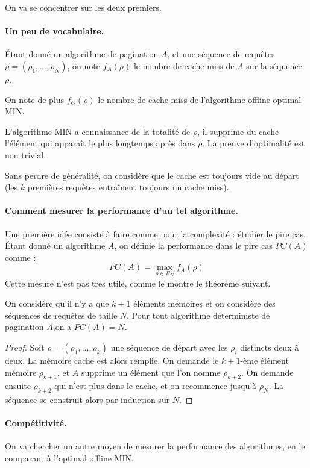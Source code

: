 On va se concentrer sur les deux premiers. 

\paragraph{Un peu de vocabulaire.} Étant donné un algorithme de pagination $A$, et une séquence de requêtes $\rho = (\rho_1,...,\rho_N)$, on note $f_A(\rho)$ le nombre de cache miss de $A$ sur la séquence $\rho$.

On note de plus $f_O(\rho)$ le nombre de cache miss de l'algorithme offline optimal MIN.

\begin{rem}
L'algorithme MIN a connaissance de la totalité de $\rho$, il supprime du cache l'élément qui apparaît le plus longtemps après dans $\rho$. La preuve d'optimalité est non trivial.
\end{rem}

\begin{rem}
Sans perdre de généralité, on considère que le cache est toujours vide au départ (les $k$ premières requêtes entraînent toujours un cache miss).
\end{rem}

\paragraph{Comment mesurer la performance d'un tel algorithme.} Une première idée consiste à faire comme pour la complexité : étudier le pire cas. Étant donné un algorithme $A$, on définie la performance dans le pire cas $PC(A)$ comme :
$$
PC(A) = \max_{\rho \in R_N} f_A(\rho)
$$
Cette mesure n'est pas très utile, comme le montre le théorème suivant.
\begin{theorem} On considère qu'il n'y a que $k+1$ éléments mémoires et on considère des séquences de requêtes de taille $N$. Pour tout algorithme déterministe de pagination $A$,on a $PC(A)=N$.
\end{theorem}
\begin{proof} Soit $\rho=(\rho_1,...,\rho_{k})$ une séquence de départ avec les $\rho_i$ distincts deux à deux. La mémoire cache est alors remplie. On demande le $k+1$-ème élément mémoire $\rho_{k+1}$, et $A$ supprime un élément que l'on nomme $\rho_{k+2}$. On demande ensuite $\rho_{k+2}$ qui n'est plus dans le cache, et on recommence jusqu'à $\rho_N$. La séquence se construit alors par induction sur $N$.
\end{proof}

\paragraph{Compétitivité.} On va chercher un autre moyen de mesurer la performance des algorithmes, en le comparant à l'optimal offline MIN.

